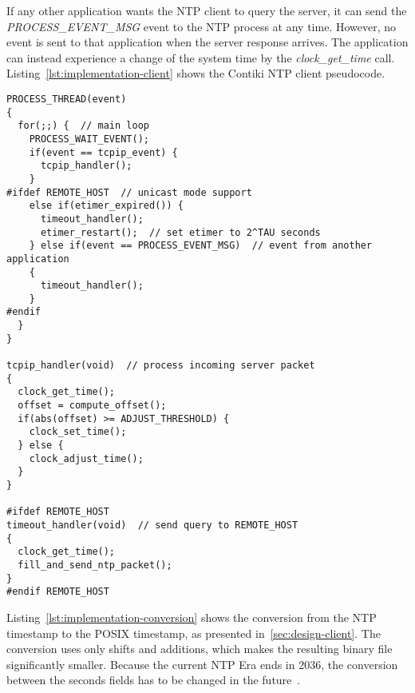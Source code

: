 If any other application wants the NTP client to query the server,
it can send the {\it{PROCESS\_EVENT\_MSG}} event to the NTP process at any time.
However, no event is sent to that application when the server response arrives.
The application can instead experience a change of
the system time by the {\it{clock\_get\_time}} call.
Listing~\ref{lst:implementation-client} shows the Contiki NTP client pseudocode.
\newpage
\begin{lstlisting}[caption={NTP client pseudocode},label={lst:implementation-client}]
PROCESS_THREAD(event)
{
  for(;;) {  // main loop
    PROCESS_WAIT_EVENT();
    if(event == tcpip_event) {
      tcpip_handler();
    }
#ifdef REMOTE_HOST  // unicast mode support
    else if(etimer_expired()) {
      timeout_handler();
      etimer_restart();  // set etimer to 2^TAU seconds
    } else if(event == PROCESS_EVENT_MSG)  // event from another application
    {
      timeout_handler();
    }
#endif
  }
}

tcpip_handler(void)  // process incoming server packet
{
  clock_get_time();
  offset = compute_offset();
  if(abs(offset) >= ADJUST_THRESHOLD) {
    clock_set_time();
  } else {
    clock_adjust_time();
  }
}

#ifdef REMOTE_HOST
timeout_handler(void)  // send query to REMOTE_HOST
{
  clock_get_time();
  fill_and_send_ntp_packet();
}
#endif REMOTE_HOST
\end{lstlisting}

Listing~\ref{lst:implementation-conversion} shows the conversion from the NTP timestamp to the POSIX timestamp,
as presented in~\ref{sec:design-client}.
The conversion uses only shifts and additions, which makes the resulting binary file
significantly smaller.
Because the current NTP Era ends in 2036,
the conversion between the seconds fields has to be changed in the future~\cite{ntp-y2k}. %

